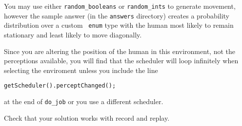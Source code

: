 You may use either \texttt{random\_booleans} or \texttt{random\_ints} to generate movement, however the sample answer (in the \texttt{answers} directory) creates a probability distribution over a custom \java\ \texttt{enum} type with the human most likely to remain stationary and least likely to move diagonally.

Since you are altering the position of the human in this environment, not the perceptions available, you will find that the scheduler will loop infinitely when selecting the enviroment unless you include the line
\begin{verbatim}
getScheduler().perceptChanged();
\end{verbatim}
at the end of \texttt{do\_job} or you use a different scheduler.

Check that your solution works with record and replay.

